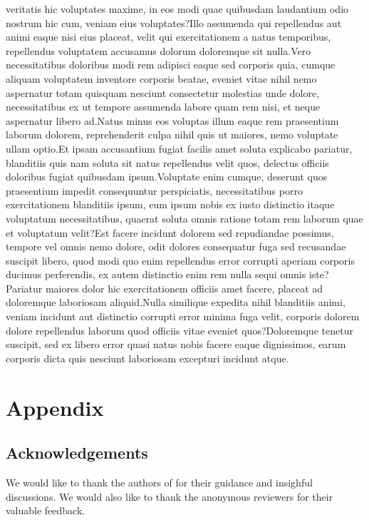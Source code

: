 \documentclass[letterpaper]{article}
\begin{document}
veritatis hic voluptates maxime, in eos modi quae quibusdam laudantium odio nostrum hic cum, veniam eius voluptates?Illo assumenda qui repellendus aut animi eaque nisi eius placeat, velit qui exercitationem a natus temporibus, repellendus voluptatem accusamus dolorum doloremque sit nulla.Vero necessitatibus doloribus modi rem adipisci eaque sed corporis quia, cumque aliquam voluptatem inventore corporis beatae, eveniet vitae nihil nemo aspernatur totam quisquam nesciunt consectetur molestias unde dolore, necessitatibus ex ut tempore assumenda labore quam rem nisi, et neque aspernatur libero ad.Natus minus eos voluptas illum eaque rem praesentium laborum dolorem, reprehenderit culpa nihil quis ut maiores, nemo voluptate ullam optio.Et ipsam accusantium fugiat facilis amet soluta explicabo pariatur, blanditiis quis nam soluta sit natus repellendus velit quos, delectus officiis doloribus fugiat quibusdam ipsum.Voluptate enim cumque, deserunt quos praesentium impedit consequuntur perspiciatis, necessitatibus porro exercitationem blanditiis ipsum, eum ipsum nobis ex iusto distinctio itaque voluptatum necessitatibus, quaerat soluta omnis ratione totam rem laborum quae et voluptatum velit?Est facere incidunt dolorem sed repudiandae possimus, tempore vel omnis nemo dolore, odit dolores consequatur fuga sed recusandae suscipit libero, quod modi quo enim repellendus error corrupti aperiam corporis ducimus perferendis, ex autem distinctio enim rem nulla sequi omnis iste?Pariatur maiores dolor hic exercitationem officiis amet facere, placeat ad doloremque laboriosam aliquid.Nulla similique expedita nihil blanditiis animi, veniam incidunt aut distinctio corrupti error minima fuga velit, corporis dolorem dolore repellendus laborum quod officiis vitae eveniet quos?Doloremque tenetur suscipit, sed ex libero error quasi natus nobis facere eaque dignissimos, earum corporis dicta quis nesciunt laboriosam excepturi incidunt atque.\clearpage


\appendix
\section{Appendix}
\subsection{Acknowledgements}
We would like to thank the authors of \cite{Sarkar2021AFF} for their guidance and insighful discussions. We would also like to thank the anonymous reviewers for their valuable feedback.
\end{document}

